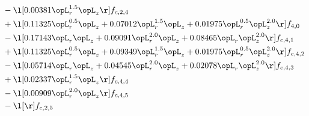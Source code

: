 \begin{alignat}{2}
& - \l[  0.00381 \opL_r^{1.5} \opL_z  \r] f_{c,2,4} \nonumber \\ 
& + \l[  0.11325 \opL_r^{0.5} \opL_z +  0.07012 \opL_r^{1.5} \opL_z +  0.01975 \opL_r^{0.5} \opL_z^{2.0}  \r] f_{4,0} \nonumber \\ 
& - \l[  0.17143 \opL_r \opL_z +  0.09091 \opL_r^{2.0} \opL_z +  0.08465 \opL_r \opL_z^{2.0}  \r] f_{c,4,1} \nonumber \\ 
& + \l[  0.11325 \opL_r^{0.5} \opL_z +  0.09349 \opL_r^{1.5} \opL_z +  0.01975 \opL_r^{0.5} \opL_z^{2.0}  \r] f_{c,4,2} \nonumber \\ 
& - \l[  0.05714 \opL_r \opL_z +  0.04545 \opL_r^{2.0} \opL_z +  0.02078 \opL_r \opL_z^{2.0}  \r] f_{c,4,3} \nonumber \\ 
& + \l[  0.02337 \opL_r^{1.5} \opL_z  \r] f_{c,4,4} \nonumber \\ 
& - \l[  0.00909 \opL_r^{2.0} \opL_z  \r] f_{c,4,5} \nonumber \\ 
& - \l[  \r] f_{c,2,5} \nonumber \\ 
\end{alignat} 


